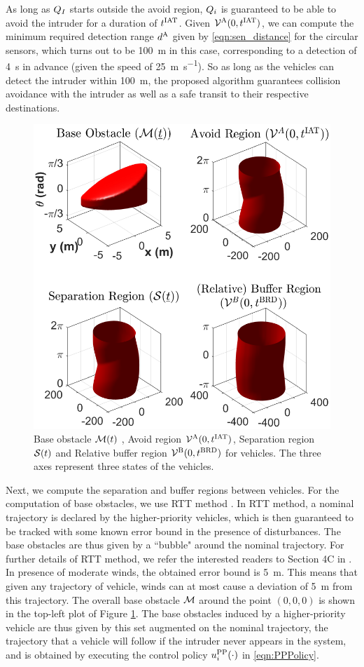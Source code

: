 As long as $Q_{I}$ starts outside the avoid region, $Q_i$ is guaranteed to be able to avoid the intruder for a duration of $t^\text{IAT}$. Given $\mathcal{V}^{\text{A}}(0, t^\text{IAT})$, we can compute the minimum required detection range $d^\text{A}$ given by \eqref{eqn:sen_distance} for the circular sensors, which turns out to be \SI{100}{\m} in this case, corresponding to a detection of \SI{4}{\s} in advance (given the speed of \SI{25}{\m\per\s}). So as long as the vehicles can detect the intruder within \SI{100}{\m}, the proposed algorithm guarantees collision avoidance with the intruder as well as a safe transit to their respective destinations.   
\begin{figure}
  \centering
  \includegraphics[width=0.8\columnwidth]{"figs/bufferRegion_steps"}
  \caption{Base obstacle $\mathcal{M}(t)$ , Avoid region $\mathcal{V}^{\text{A}}(0, t^\text{IAT})$, Separation region $\mathcal{S}(t)$ and Relative buffer region $\mathcal{V}^{\text{B}}(0, t^\text{BRD})$ for vehicles. The three axes represent three states of the vehicles.}
  \label{fig:MaxMin}
\end{figure}

Next, we compute the separation and buffer regions between vehicles. For the computation of base obstacles, we use RTT method \cite{Bansal2017}. In RTT method, a nominal trajectory is declared by the higher-priority vehicles, which is then guaranteed to be tracked with some known error bound in the presence of disturbances. The base obstacles are thus given by a ``bubble" around the nominal trajectory. For further details of RTT method, we refer the interested readers to Section 4C in \cite{Bansal2017}. In presence of moderate winds, the obtained error bound is \SI{5}{\m}. This means that given any trajectory of vehicle, winds can at most cause a deviation of \SI{5}{\m} from this trajectory. The overall base obstacle $\mathcal{M}$ around the point $(0, 0, 0)$ is shown in the top-left plot of Figure \ref{fig:MaxMin}. The base obstacles induced by a higher-priority vehicle are thus given by this set augmented on the nominal trajectory, the trajectory that a vehicle will follow if the intruder never appears in the system, and is obtained by executing the control policy ${u^{\text{PP}}_{i}}(\cdot)$ in \eqref{eqn:PPPolicy}.

